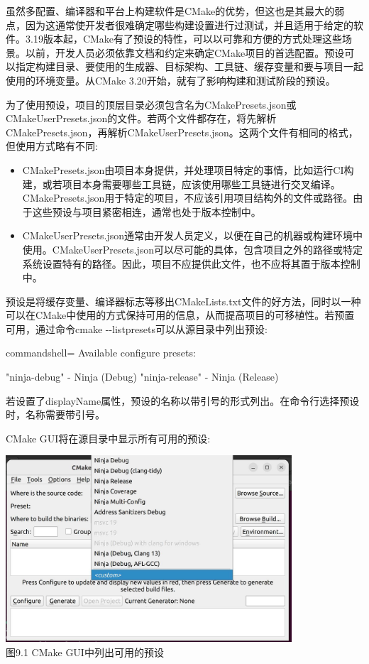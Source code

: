 虽然多配置、编译器和平台上构建软件是CMake的优势，但这也是其最大的弱点，因为这通常使开发者很难确定哪些构建设置进行过测试，并且适用于给定的软件。3.19版本起，CMake有了预设的特性，可以以可靠和方便的方式处理这些场景。以前，开发人员必须依靠文档和约定来确定CMake项目的首选配置。预设可以指定构建目录、要使用的生成器、目标架构、工具链、缓存变量和要与项目一起使用的环境变量。从CMake 3.20开始，就有了影响构建和测试阶段的预设。

为了使用预设，项目的顶层目录必须包含名为CMakePresets.json或CMakeUserPresets.json的文件。若两个文件都存在，将先解析CMakePresets.json，再解析CMakeUserPresets.json。这两个文件有相同的格式，但使用方式略有不同:

\begin{itemize}
\item 
CMakePresets.json由项目本身提供，并处理项目特定的事情，比如运行CI构建，或若项目本身需要哪些工具链，应该使用哪些工具链进行交叉编译。CMakePresets.json用于特定的项目，不应该引用项目结构外的文件或路径。由于这些预设与项目紧密相连，通常也处于版本控制中。

\item 
CMakeUserPresets.json通常由开发人员定义，以便在自己的机器或构建环境中使用。CMakeUserPresets.json可以尽可能的具体，包含项目之外的路径或特定系统设置特有的路径。因此，项目不应提供此文件，也不应将其置于版本控制中。
\end{itemize}

预设是将缓存变量、编译器标志等移出CMakeLists.txt文件的好方法，同时以一种可以在CMake中使用的方式保持可用的信息，从而提高项目的可移植性。若预置可用，通过命令cmake -{}-listpresets可以从源目录中列出预设:

\begin{tcblisting}{commandshell={}}
Available configure presets:

  "ninja-debug" - Ninja (Debug)
  "ninja-release" - Ninja (Release)
\end{tcblisting}

若设置了displayName属性，预设的名称以带引号的形式列出。在命令行选择预设时，名称需要带引号。

CMake GUI将在源目录中显示所有可用的预设:

\begin{center}
\includegraphics[width=0.8\textwidth]{content/2/chapter9/images/2.jpg}\\
图9.1 CMake GUI中列出可用的预设
\end{center}

